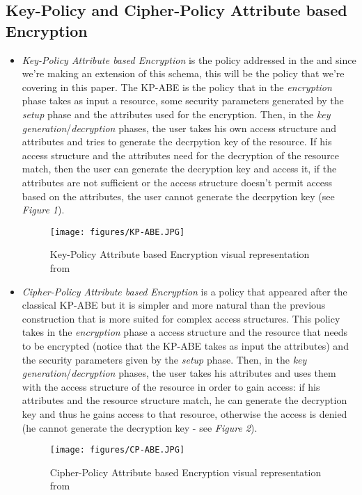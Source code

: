 \documentclass[12pt]{article}
\begin{document}
\subsection{Key-Policy and Cipher-Policy Attribute based Encryption}

\begin{itemize}
  \item \textit{Key-Policy Attribute based Encryption} is the policy addressed in the \cite{fltccd} and since we're making an extension of this schema, this will be the policy that we're covering in this paper. The KP-ABE is the policy that in the \textit{encryption} phase takes as input a resource, some security parameters generated by the \textit{setup} phase and the attributes used for the encryption. Then, in the \textit{key generation}/\textit{decryption} phases, the user takes his own access structure and attributes and tries to generate the decrpytion key of the resource. If his access structure and the attributes need for the decryption of the resource match, then the user can generate the decryption key and access it, if the attributes are not sufficient or the access structure doesn't permit access based on the attributes, the user cannot generate the decrpytion key (see \textit{Figure 1}).

  \begin{center}
  	\begin{figure}[htpb]
    \centering
    \texttt{[image: figures/KP-ABE.JPG]}
    \caption{
        Key-Policy Attribute based Encryption visual representation from \cite{ka}
    }
	\end{figure}
  \end{center}

  \item \textit{Cipher-Policy Attribute based Encryption} is a policy that appeared after the classical KP-ABE but it is simpler and more natural than the previous construction that is more suited for complex access structures. This policy takes in the \textit{encryption} phase a access structure and the resource that needs to be encrypted (notice that the KP-ABE takes as input the attributes) and the security parameters given by the \textit{setup} phase. Then, in the \textit{key generation}/\textit{decryption} phases, the user takes his attributes and uses them with the access structure of the resource in order to gain access: if his attributes and the resource structure match, he can generate the decryption key and thus he gains access to that resource, otherwise the access is denied (he cannot generate the decryption key - see \textit{Figure 2}).

  \begin{center}
  	\begin{figure}[htpb]
    \centering
    \texttt{[image: figures/CP-ABE.JPG]}
    \caption{
        Cipher-Policy Attribute based Encryption visual representation from \cite{ka}
    }
	\end{figure}
  \end{center}
\end{itemize}
\end{document}
